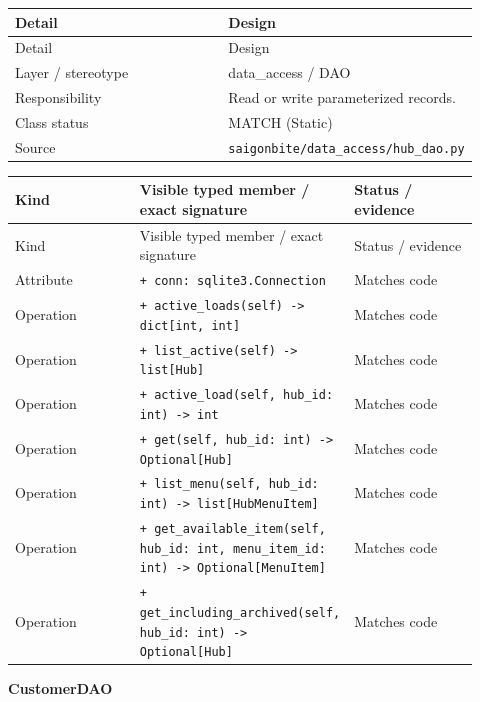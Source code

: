\begin{longtable}{>{\raggedright\arraybackslash}p{0.4600\linewidth}>{\raggedright\arraybackslash}p{0.4600\linewidth}}
Detail & Design \\
\hline\endfirsthead
Detail & Design \\
\hline\endhead
Layer / stereotype & data\_access / \guillemotleft{}DAO\guillemotright{} \\
Responsibility & Read or write parameterized records. \\
Class status & MATCH (Static) \\
Source & \texttt{saigonbite/\allowbreak{}data\_\allowbreak{}access/\allowbreak{}hub\_\allowbreak{}dao.\allowbreak{}py} \\
\end{longtable}
\begin{longtable}{>{\raggedright\arraybackslash}p{0.3067\linewidth}>{\raggedright\arraybackslash}p{0.3067\linewidth}>{\raggedright\arraybackslash}p{0.3067\linewidth}}
Kind & Visible typed member / exact signature & Status / evidence \\
\hline\endfirsthead
Kind & Visible typed member / exact signature & Status / evidence \\
\hline\endhead
Attribute & \texttt{+ conn: sqlite3.\allowbreak{}Connection} & Matches code \\
Operation & \texttt{+ active\_\allowbreak{}loads(self) -\textgreater{} dict[int, int]} & Matches code \\
Operation & \texttt{+ list\_\allowbreak{}active(self) -\textgreater{} list[Hub]} & Matches code \\
Operation & \texttt{+ active\_\allowbreak{}load(self, hub\_\allowbreak{}id: int) -\textgreater{} int} & Matches code \\
Operation & \texttt{+ get(self, hub\_\allowbreak{}id: int) -\textgreater{} Optional[Hub]} & Matches code \\
Operation & \texttt{+ list\_\allowbreak{}menu(self, hub\_\allowbreak{}id: int) -\textgreater{} list[HubMenuItem]} & Matches code \\
Operation & \texttt{+ get\_\allowbreak{}available\_\allowbreak{}item(self, hub\_\allowbreak{}id: int, menu\_\allowbreak{}item\_\allowbreak{}id: int) -\textgreater{} Optional[MenuItem]} & Matches code \\
Operation & \texttt{+ get\_\allowbreak{}including\_\allowbreak{}archived(self, hub\_\allowbreak{}id: int) -\textgreater{} Optional[Hub]} & Matches code \\
\end{longtable}
\textbf{CustomerDAO}

